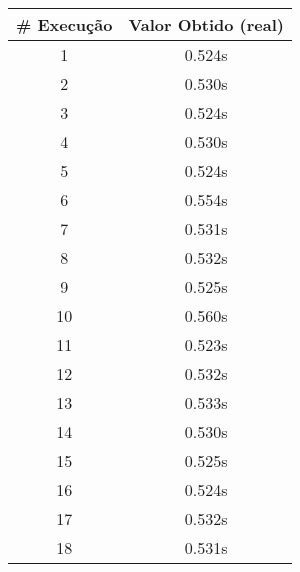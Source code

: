 \documentclass[11pt]{article}
\begin{document}
\begin{table}[!h]
\begin{center}
\begin{minipage}{0.48\textwidth}
\begin{tabular}{| c | c |}
				\textbf{\# Execução} &  \textbf{Valor Obtido (real)} \\ \hline
				1 & 0.524s \\ \hline
				2 & 0.530s \\ \hline
				3 & 0.524s \\ \hline
				4 & 0.530s \\ \hline
				5 & 0.524s \\ \hline
				6 & 0.554s \\ \hline
				7 & 0.531s \\ \hline
				8 & 0.532s \\ \hline
				9 & 0.525s \\ \hline
				10 & 0.560s \\ \hline
				11 & 0.523s \\ \hline
				12 & 0.532s \\ \hline
				13 & 0.533s \\ \hline
				14 & 0.530s \\ \hline
				15 & 0.525s \\ \hline
				16 & 0.524s \\ \hline
				17 & 0.532s \\ \hline
				18 & 0.531s \\ \hline
			\end{tabular}
		\end{minipage}
	\end{center}
\end{table}

\pagebreak
\end{document}
